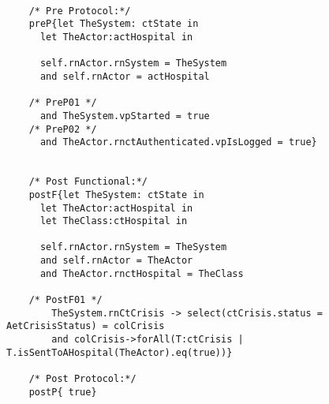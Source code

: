 	\scriptsize
	\vspace{0.5cm}
	\begin{lstlisting}[style=MessirStyle,firstnumber=auto,captionpos=b,caption={\msrmessir (MCL-oriented) specification of the operation \emph{oeGetHospitalCrisisSet}.},label=OM-actHospital-oeGetHospitalCrisisSet-MCL-LST]

	/* Pre Protocol:*/ 
	preP{let TheSystem: ctState in
	  let TheActor:actHospital in
	  
	  self.rnActor.rnSystem = TheSystem
	  and self.rnActor = actHospital
	  
	/* PreP01 */
	  and TheSystem.vpStarted = true
	/* PreP02 */
	  and TheActor.rnctAuthenticated.vpIsLogged = true}
	
	
	/* Post Functional:*/ 
	postF{let TheSystem: ctState in
	  let TheActor:actHospital in
	  let TheClass:ctHospital in
	  
	  self.rnActor.rnSystem = TheSystem
	  and self.rnActor = TheActor
	  and TheActor.rnctHospital = TheClass
	  
	/* PostF01 */
		TheSystem.rnCtCrisis -> select(ctCrisis.status = AetCrisisStatus) = colCrisis
		and colCrisis->forAll(T:ctCrisis | T.isSentToAHospital(TheActor).eq(true))}
	
	/* Post Protocol:*/ 
	postP{ true}
	
	\end{lstlisting}
	\normalsize 
	
	
	
	





